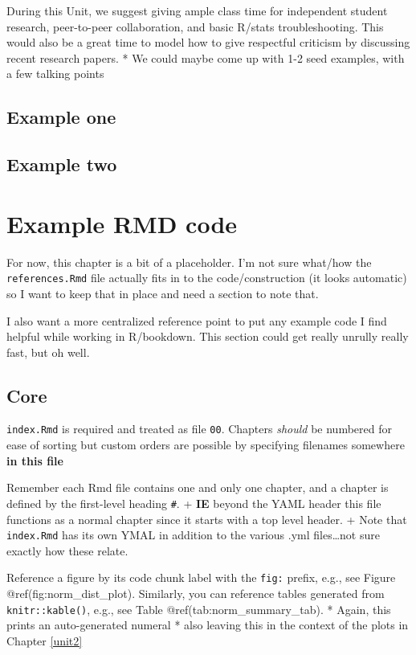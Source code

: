 \documentclass[
]{book}
\begin{document}
During this Unit, we suggest giving ample class time for independent student research, peer-to-peer collaboration, and basic R/stats troubleshooting. This would also be a great time to model how to give respectful criticism by discussing recent research papers.
* We could maybe come up with 1-2 seed examples, with a few talking points

\hypertarget{example-one}{%
\section{Example one}\label{example-one}}

\hypertarget{example-two}{%
\section{Example two}\label{example-two}}

\hypertarget{ex_code}{%
\chapter{Example RMD code}\label{ex_code}}

For now, this chapter is a bit of a placeholder. I'm not sure what/how the \texttt{references.Rmd} file actually fits in to the code/construction (it looks automatic) so I want to keep that in place and need a section to note that.

I also want a more centralized reference point to put any example code I find helpful while working in R/bookdown. This section could get really unrully really fast, but oh well.

\hypertarget{core}{%
\section{Core}\label{core}}

\texttt{index.Rmd} is required and treated as file \texttt{00}. Chapters \emph{should} be numbered for ease of sorting but custom orders are possible by specifying filenames somewhere \textbf{in this file}

Remember each Rmd file contains one and only one chapter, and a chapter is defined by the first-level heading \texttt{\#}.
+ \textbf{IE} beyond the YAML header this file functions as a normal chapter since it starts with a top level header.
+ Note that \texttt{index.Rmd} has its own YMAL in addition to the various .yml files\ldots not sure exactly how these relate.

Reference a figure by its code chunk label with the \texttt{fig:} prefix, e.g., see Figure @ref(fig:norm\_dist\_plot). Similarly, you can reference tables generated from \texttt{knitr::kable()}, e.g., see Table @ref(tab:norm\_summary\_tab).
* Again, this prints an auto-generated numeral
* also leaving this in the context of the plots in Chapter \ref{unit2}
\end{document}
